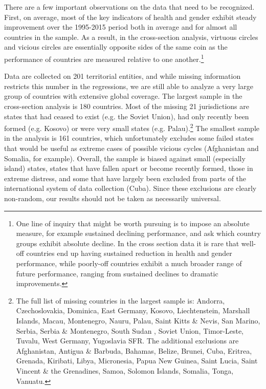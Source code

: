 \documentclass[12pt]{article}
\begin{document}
There are a few important observations on the data that need to be recognized. First, on average, most of the key indicators of health and gender exhibit steady improvement over the 1995-2015 period both in average and for almost all countries in the sample. As a result, in the cross-section analysis, virtuous circles and vicious circles are essentially opposite sides of the same coin as the performance of countries are measured relative to one another.\footnote{
One line of inquiry that might be worth pursuing is to impose an absolute measure, for example sustained declining performance, and ask which country groups exhibit absolute decline. In the cross section data it is rare that well-off countries end up having sustained reduction in health and gender performance, while poorly-off countries exhibit a much broader range of future performance, ranging from sustained declines to dramatic improvements.}


Data are collected on 201 territorial entities, and while missing information restricts this number in the regressions, we are still able to analyze a very large group of countries with extensive global coverage. The largest sample in the cross-section analysis is 180 countries. Most of the missing 21 jurisdictions are states that had ceased to exist (e.g. the Soviet Union), had only recently been formed (e.g. Kosovo) or were very small states (e.g. Palau).\footnote{\label{fn2}
The full list of missing countries in the largest sample is: Andorra, Czechoslovakia, Dominica, East Germany, Kosovo, Liechtenstein, Marshall Islands, Macau, Montenegro, Nauru, Palau, Saint Kitts \& Nevis, San Marino, Serbia,
Serbia \& Montenegro, South Sudan , Soviet Union, Timor-Leste, Tuvalu, West Germany, Yugoslavia SFR. The additional exclusions are Afghanistan, Antigua \& Barbuda, Bahamas, Belize, Brunei, Cuba, Eritrea, Grenada, Kiribati, Libya, Micronesia, Papua New Guinea, Saint Lucia, Saint Vincent \& the Grenadines, Samoa, Solomon Islands, Somalia, Tonga, Vanuatu.}
The smallest sample in the analysis is 161 countries, which unfortunately excludes some failed states that would be useful as extreme cases of possible vicious cycles (Afghanistan and Somalia, for example). Overall, the sample is biased against small (especially island) states, states that have fallen apart or become recently formed, those in extreme distress, and some that have largely been excluded from parts of the international system of data collection (Cuba). Since these exclusions are clearly non-random, our results should not be taken as necessarily universal.
\end{document}
